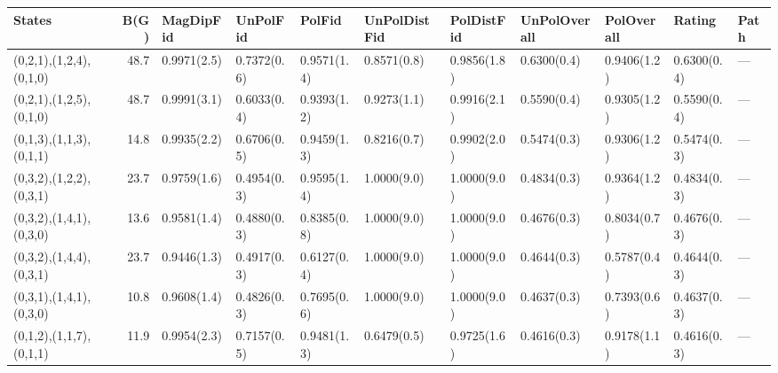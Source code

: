 \begin{tabular}{lrlllllllll}
\hline
 States                  &   B(G) & MagDipFid   & UnPolFid    & PolFid      & UnPolDistFid   & PolDistFid   & UnPolOverall   & PolOverall   & Rating      & Path   \\
\hline
 (0,2,1),(1,2,4),(0,1,0) &   48.7 & 0.9971(2.5) & 0.7372(0.6) & 0.9571(1.4) & 0.8571(0.8)    & 0.9856(1.8)  & 0.6300(0.4)    & 0.9406(1.2)  & 0.6300(0.4) & ---    \\
 (0,2,1),(1,2,5),(0,1,0) &   48.7 & 0.9991(3.1) & 0.6033(0.4) & 0.9393(1.2) & 0.9273(1.1)    & 0.9916(2.1)  & 0.5590(0.4)    & 0.9305(1.2)  & 0.5590(0.4) & ---    \\
 (0,1,3),(1,1,3),(0,1,1) &   14.8 & 0.9935(2.2) & 0.6706(0.5) & 0.9459(1.3) & 0.8216(0.7)    & 0.9902(2.0)  & 0.5474(0.3)    & 0.9306(1.2)  & 0.5474(0.3) & ---    \\
 (0,3,2),(1,2,2),(0,3,1) &   23.7 & 0.9759(1.6) & 0.4954(0.3) & 0.9595(1.4) & 1.0000(9.0)    & 1.0000(9.0)  & 0.4834(0.3)    & 0.9364(1.2)  & 0.4834(0.3) & ---    \\
 (0,3,2),(1,4,1),(0,3,0) &   13.6 & 0.9581(1.4) & 0.4880(0.3) & 0.8385(0.8) & 1.0000(9.0)    & 1.0000(9.0)  & 0.4676(0.3)    & 0.8034(0.7)  & 0.4676(0.3) & ---    \\
 (0,3,2),(1,4,4),(0,3,1) &   23.7 & 0.9446(1.3) & 0.4917(0.3) & 0.6127(0.4) & 1.0000(9.0)    & 1.0000(9.0)  & 0.4644(0.3)    & 0.5787(0.4)  & 0.4644(0.3) & ---    \\
 (0,3,1),(1,4,1),(0,3,0) &   10.8 & 0.9608(1.4) & 0.4826(0.3) & 0.7695(0.6) & 1.0000(9.0)    & 1.0000(9.0)  & 0.4637(0.3)    & 0.7393(0.6)  & 0.4637(0.3) & ---    \\
 (0,1,2),(1,1,7),(0,1,1) &   11.9 & 0.9954(2.3) & 0.7157(0.5) & 0.9481(1.3) & 0.6479(0.5)    & 0.9725(1.6)  & 0.4616(0.3)    & 0.9178(1.1)  & 0.4616(0.3) & ---    \\
\hline
\end{tabular}